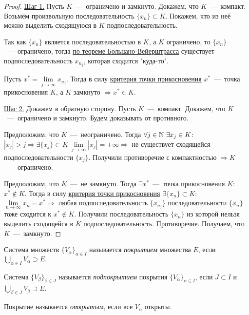 \begin{proof}
    \underline{Шаг 1.} Пусть $K$~---~ограничено и замкнуто. Докажем, что $K$~---~компакт. Возьмём произвольную последовательность $\{ x_{n} \} \subset K$. Покажем, что из неё можно выделить сходящуюся в $K$ подпоследовательность.

    Так как $\{ x_{n} \}$ является последовательностью в $K$, а $K$ ограничено, то $\{ x_{n} \}$~---~ограничено, тогда \hyperlink{thm2.8}{по теореме Больцано-Вейерштрасса} существует подпоследовательность $x_{n_{j}}$, которая сходится "куда-то".

    Пусть $x^{*} = \lim\limits_{j\to \infty} x_{n_{j}}$. Тогда в силу \hyperlink{thm3.1}{критерия точки прикосновения} $x^{*}$~---~точка прикосновения $K$, а $K$ замкнуто $\Rightarrow x^{*} \in K.$

    \underline{Шаг 2.} Докажем в обратную сторону. Пусть $K$~---~компакт. Докажем, что $K$~---~ограничено и замкнуто. Будем доказывать от противного. 
    
    Предположим, что $K$~---~неограничено. Тогда $\forall j \in \mathbb{N} \  \exists x_{j} \in K$: $|x_{j}| > j \Rightarrow \exists \{ x_{j} \} \subset K \  \lim\limits_{j\to \infty} |x_{j}| = +\infty \Rightarrow$ не существует сходящейся подпоследовательности $\{ x_{j} \}$. Получили противоречие с компактностью $\Rightarrow K$~---~ограничено.

    Предположим, что $K$~---~не замкнуто. Тогда $\exists x^{*}$~---~точка прикосновения $K$: $x^{*} \notin K$. Тогда в силу \hyperlink{thm3.1}{критерия точки прикосновения} $\exists \{ x_{n} \} \subset K$: $\lim\limits_{n\to \infty} x_{n} = x^{*} \Rightarrow$ любая подпоследовательность $\{ x_{n_{j}} \}$ последовательности $\{ x_{n} \}$ тоже сходится к $x^{*} \notin K.$ Получили последовательность $\{ x_{n} \}$ из которой нельзя выделить сходящейся в $K$ подпоследовательность. Противоречие. Получаем, что $K$~---~замкнуто.
\end{proof}
\begin{definition}
    Система множеств $\{ V_{\alpha} \}_{\alpha \in I}$ называется \textit{покрытием} множества $E$, если $\bigcup\limits_{\alpha \in I} V_{\alpha} \supset E.$
\end{definition}
\begin{definition}
    Система $\{ V_{\beta} \}_{\beta\in J}$ называется \textit{подпокрытием} покрытия $\{ V_{\alpha} \}_{\alpha \in I}$, если $J \subset I$ и $\bigcup\limits_{\beta \in J} V_{\beta} \supset E$.
\end{definition}
\begin{definition}
    Покрытие называется \textit{открытым}, если все $V_{\alpha}$ открыты.
\end{definition}
